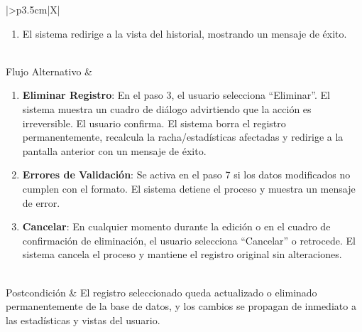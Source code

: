 \begin{xltabular}{\textwidth}{|>{\bfseries}p{3.5cm}|X|}
\begin{enumerate}[leftmargin=0.5cm, topsep=0pt, partopsep=0pt, parsep=0pt, itemsep=4pt]
        \item El sistema redirige a la vista del historial, mostrando un mensaje de éxito.
    \end{enumerate} 
    \\ \hline
    Flujo Alternativo & 
    \begin{enumerate}[leftmargin=0.5cm, topsep=0pt, partopsep=0pt, parsep=0pt, itemsep=4pt]
        \item \textbf{Eliminar Registro}: En el paso 3, el usuario selecciona ``Eliminar''. El sistema muestra un cuadro de diálogo advirtiendo que la acción es irreversible. El usuario confirma. El sistema borra el registro permanentemente, recalcula la racha/estadísticas afectadas y redirige a la pantalla anterior con un mensaje de éxito.
        \item \textbf{Errores de Validación}: Se activa en el paso 7 si los datos modificados no cumplen con el formato. El sistema detiene el proceso y muestra un mensaje de error.
        \item \textbf{Cancelar}: En cualquier momento durante la edición o en el cuadro de confirmación de eliminación, el usuario selecciona ``Cancelar'' o retrocede. El sistema cancela el proceso y mantiene el registro original sin alteraciones.
    \end{enumerate}
    \\ \hline
    Postcondición & El registro seleccionado queda actualizado o eliminado permanentemente de la base de datos, y los cambios se propagan de inmediato a las estadísticas y vistas del usuario. \\ \hline

    \caption{CU7: Gestionar Registros}
    \label{tab:esp_cu7} \\
\end{xltabular}
\endgroup


